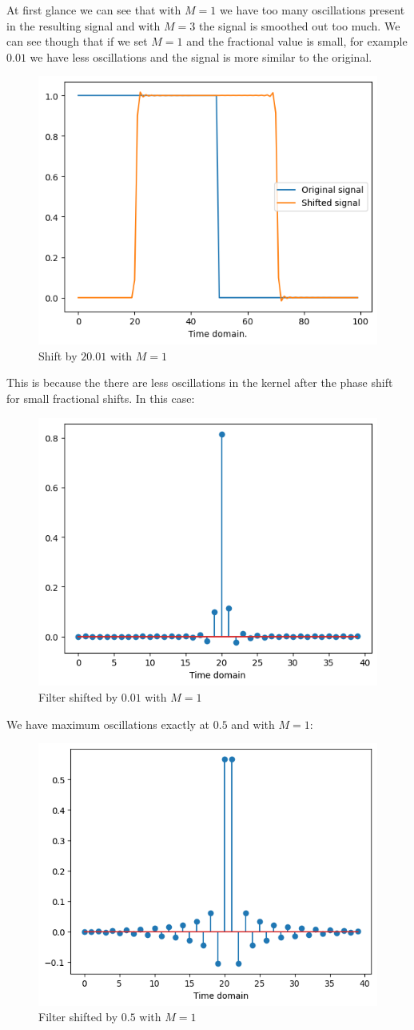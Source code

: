 \documentclass[]{usiinfbachelorproject}
\begin{document}
		At first glance we can see that with $M=1$ we have too many oscillations present in the resulting signal and with $M=3$ the signal is smoothed out too much. We can see though that if we set $M=1$ and the fractional value is small, for example $0.01$ we have less oscillations and the signal is more similar to the original.
		
		\begin{figure}[h]
			\centering
			\includegraphics[width=0.4\columnwidth]{images/Results/M_1_small_shift.png}
			\caption{Shift by $20.01$ with $M=1$}
			\label{small_shift_M_1}
		\end{figure}
		
		This is because the there are less oscillations in the kernel after the phase shift for small fractional shifts. In this case:
		\begin{figure}[h]
			\centering
			\includegraphics[width=0.4\columnwidth]{images/Results/M_1_filter_small_shift.png}
			\caption{Filter shifted by $0.01$ with $M=1$}
			\label{small_shift_M_1_filter}
		\end{figure}
		
		We have maximum oscillations exactly at $0.5$ and with $M=1$:
		\begin{figure}[h]
			\centering
			\includegraphics[width=0.4\columnwidth]{images/Results/M_1_filter_big_shift.png}
			\caption{Filter shifted by $0.5$ with $M=1$}
			\label{big_shift_M_1_filter}
		\end{figure}
		
\end{document}
